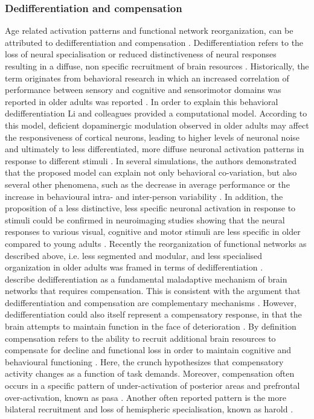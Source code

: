 \subsubsection{Dedifferentiation and compensation}
\label{theory:aging:dedif}
Age related activation patterns and functional network reorganization, can be attributed to dedifferentiation and compensation \cite{Grady2012}. Dedifferentiation refers to the loss of neural specialisation or reduced distinctiveness of neural responses resulting in a diffuse, non specific recruitment of brain resources \cite{Koen2019}. Historically, the term originates from behavioral research in which an increased correlation of performance between sensory and cognitive and sensorimotor domains was reported in older adults was reported \cite{Baltes1997,Li2002}. In order to explain this behavioral dedifferentiation Li and colleagues \cite{Li2001, Li2002} provided a computational model. According to this model, deficient dopaminergic modulation observed in older adults may affect the responsiveness of cortical neurons, leading to higher levels of neuronal noise and ultimately to less differentiated, more diffuse neuronal activation patterns in response to different stimuli \cite{Li2001,Li2002}. In several simulations, the authors demonstrated that the proposed model can explain not only behavioral co-variation, but also several other phenomena, such as the decrease in average performance or the increase in behavioural intra- and inter-person variability \cite{Li2000,Li2002}. In addition, the proposition of a less distinctive, less specific neuronal activation in response to stimuli could be confirmed in neuroimaging studies showing that the neural responses to various visual, cognitive and motor stimuli are less specific in older compared to young adults \cite{Tucker2019, Koen2019,Carb2011}. Recently the reorganization of functional networks as described above, i.e. less segmented and modular, and less specialised organization in older adults was framed in terms of dedifferentiation \cite{Deery2023, Koen2019, Sala-Llonch2015}.\\
\citeauthor{Fornito2015}\cite{Fornito2015} describe dedifferentiation as a fundamental maladaptive mechanism of brain networks that requires compensation. This is consistent with the argument that dedifferentiation and compensation are complementary mechanisms \cite{Reuter-Lorenz2010}. However, dedifferentiation could also itself represent a compensatory response, in that the brain attempts to maintain function in the face of deterioration \cite{Stern2009}. By definition compensation refers to the ability to recruit additional brain resources to compensate for decline and functional loss in order to maintain cognitive and behavioural functioning \cite{Reuter-Lorenz2010, Grady2012}. Here, the \gls{crunch} hypothesizes that compensatory activity changes as a function of task demands. Moreover, compensation often occurs in a specific pattern of under-activation of posterior areas and prefrontal over-activation, known as \gls{pasa} \cite{Davis2007}. Another often reported pattern is the more bilateral recruitment and loss of hemispheric specialisation, known as \gls{harold} \cite{Cabeza2002}.

